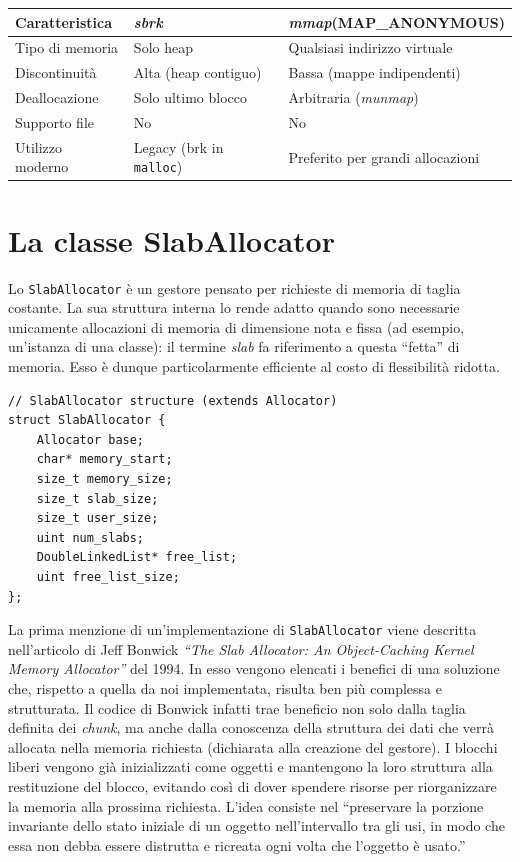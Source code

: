 \begin{center}
\begin{tabular}{|l|l|l|}
\hline
Caratteristica & \textit{sbrk} & \textit{mmap}(MAP\_ANONYMOUS) \\
\hline
Tipo di memoria & Solo heap & Qualsiasi indirizzo virtuale \\
Discontinuità & Alta (heap contiguo) & Bassa (mappe indipendenti) \\
Deallocazione & Solo ultimo blocco & Arbitraria (\textit{munmap}) \\
Supporto file & No & No \\
Utilizzo moderno & Legacy (brk in \texttt{malloc}) & Preferito per grandi allocazioni \\
\hline
\end{tabular}
\end{center}


\section{La classe SlabAllocator}
Lo \texttt{SlabAllocator} è un gestore pensato per richieste di memoria di taglia costante. La sua struttura interna lo rende adatto quando sono necessarie unicamente allocazioni di memoria di dimensione nota e fissa (ad esempio, un'istanza di una classe): il termine \textit{slab} fa riferimento a questa “fetta” di memoria. Esso è dunque particolarmente efficiente al costo di flessibilità ridotta.

\begin{lstlisting}
// SlabAllocator structure (extends Allocator)
struct SlabAllocator {
    Allocator base;
    char* memory_start;
    size_t memory_size;
    size_t slab_size;   
    size_t user_size;
    uint num_slabs;
    DoubleLinkedList* free_list;   
    uint free_list_size;
};
\end{lstlisting}

La prima menzione di un’implementazione di \texttt{SlabAllocator} viene descritta nell’articolo di Jeff Bonwick \textit{“The Slab Allocator: An Object-Caching Kernel Memory Allocator”}\cite{slab} del 1994. In esso vengono elencati i benefici di una soluzione che, rispetto a quella da noi implementata, risulta ben più complessa e strutturata. Il codice di Bonwick infatti trae beneficio non solo dalla taglia definita dei \textit{chunk}, ma anche dalla conoscenza della struttura dei dati che verrà allocata nella memoria richiesta (dichiarata alla creazione del gestore). I blocchi liberi vengono già inizializzati come oggetti e mantengono la loro struttura alla restituzione del blocco, evitando così di dover spendere risorse per riorganizzare la memoria alla prossima richiesta. L’idea consiste nel “preservare la porzione invariante dello stato iniziale di un oggetto nell’intervallo tra gli usi, in modo che essa non debba essere distrutta e ricreata ogni volta che l’oggetto è usato.”

